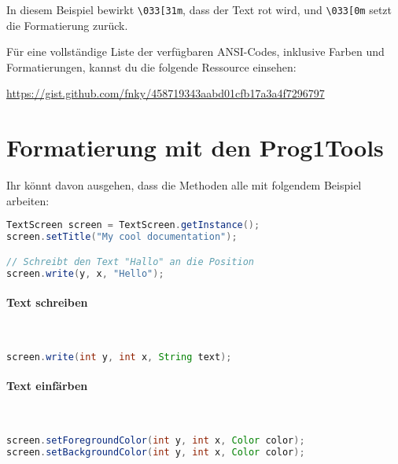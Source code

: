 \documentclass[12pt,a4paper]{article}
\begin{document}
In diesem Beispiel bewirkt \texttt{\textbackslash033[31m}, dass der Text rot wird, und \texttt{\textbackslash033[0m} setzt die Formatierung zurück.

Für eine vollständige Liste der verfügbaren ANSI-Codes, inklusive Farben und Formatierungen, kannst du die folgende Ressource einsehen:

\url{https://gist.github.com/fnky/458719343aabd01cfb17a3a4f7296797}

\newpage
\section{Formatierung mit den Prog1Tools}

Ihr könnt davon ausgehen, dass die Methoden alle mit folgendem Beispiel arbeiten:

\begin{tcolorbox}[frame empty,nobeforeafter,colback=gray!5]
\begin{lstlisting}[language=java,basicstyle=\ttfamily]
TextScreen screen = TextScreen.getInstance();
screen.setTitle("My cool documentation");

// Schreibt den Text "Hallo" an die Position
screen.write(y, x, "Hello");
\end{lstlisting}
\end{tcolorbox}

\paragraph{Text schreiben}\

\begin{tcolorbox}[frame empty,nobeforeafter,colback=gray!5]
\begin{lstlisting}[language=java,basicstyle=\ttfamily]
screen.write(int y, int x, String text);
\end{lstlisting}
\end{tcolorbox}

\paragraph{Text einfärben}\

\begin{tcolorbox}[frame empty,nobeforeafter,colback=gray!5]
\begin{lstlisting}[language=java,basicstyle=\ttfamily]
screen.setForegroundColor(int y, int x, Color color);
screen.setBackgroundColor(int y, int x, Color color);
\end{lstlisting}
\end{tcolorbox}
\end{document}
